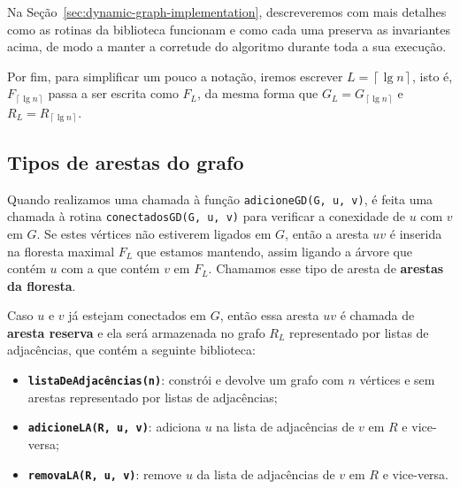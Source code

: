 Na Seção~\ref{sec:dynamic-graph-implementation}, descreveremos com mais detalhes como as rotinas da biblioteca funcionam e como cada uma preserva as invariantes acima, de modo a manter a corretude do algoritmo durante toda a sua execução.

Por fim, para simplificar um pouco a notação, iremos escrever $L = \left\lceil \lg n \right\rceil$, isto é, $F_{\left\lceil \lg n \right\rceil}$ passa a ser escrita como $F_{L}$, da mesma forma que $G_L = G_{\left\lceil \lg n \right\rceil}$ e $R_L = R_{\left\lceil \lg n \right\rceil}$.

\subsection{Tipos de arestas do grafo}
\label{sec:dynamic-graph-edge-types}


Quando realizamos uma chamada à função \texttt{adicioneGD(G, u, v)}, é feita uma chamada à rotina \texttt{conectadosGD(G, u, v)} para verificar a conexidade de $u$ com $v$ em $G$. Se estes vértices não estiverem ligados em $G$, então a aresta $uv$ é inserida na floresta maximal $F_L$ que estamos mantendo, assim ligando a árvore que contém $u$ com a que contém $v$ em $F_L$. Chamamos esse tipo de aresta de \textbf{arestas da floresta}.

Caso $u$ e $v$ já estejam conectados em $G$, então essa aresta $uv$ é chamada de \textbf{aresta reserva} e ela será armazenada no grafo $R_L$ representado por listas de adjacências, que contém a seguinte biblioteca:

\begin{itemize}
    \item \texttt{\textbf{listaDeAdjacências(n)}}: constrói e devolve um grafo com $n$ vértices e sem arestas representado por listas de adjacências;
    \item \texttt{\textbf{adicioneLA(R, u, v)}}: adiciona $u$ na lista de adjacências de $v$ em $R$ e vice-versa;
    \item \texttt{\textbf{removaLA(R, u, v)}}: remove $u$ da lista de adjacências de $v$ em $R$ e vice-versa.
\end{itemize} 


